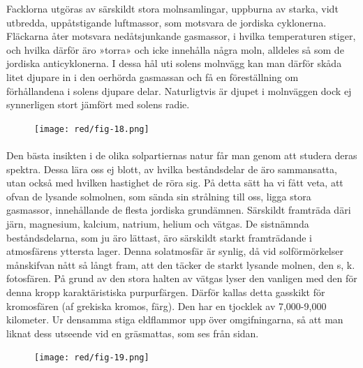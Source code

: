 \documentclass[a4paper, 12pt, oneside, swedish]{article}
\begin{document}
Facklorna utgöras av särskildt stora molnsamlingar, uppburna av starka, vidt utbredda, uppåtstigande luftmassor, som motsvara de jordiska cyklonerna. Fläckarna åter motsvara nedåtsjunkande gasmassor, i hvilka temperaturen stiger, och hvilka därför äro »torra» och icke innehålla några moln, alldeles så som de jordiska anticyklonerna. I dessa hål uti solens molnvägg kan man därför skåda litet djupare in i den oerhörda gasmassan och få en föreställning om förhållandena i solens djupare delar. Naturligtvis är djupet i molnväggen dock ej synnerligen stort jämfört med solens radie.

\begin{figure}[H]
\centering
\texttt{[image: red/fig-18.png]}
\caption{}
\end{figure}
\paragraph{}
Den bästa insikten i de olika solpartiernas natur får man genom att studera deras spektra. Dessa lära oss ej blott, av hvilka beståndsdelar de äro sammansatta, utan också med hvilken hastighet de röra sig. På detta sätt ha vi fått veta, att ofvan de lysande solmolnen, som sända sin strålning till oss, ligga stora gasmassor, innehållande de flesta jordiska grundämnen. Särskildt framträda däri järn, magnesium, kalcium, natrium, helium och vätgas. De sistnämnda beståndsdelarna, som ju äro lättast, äro särskildt starkt framträdande i atmosfärens yttersta lager. Denna solatmosfär är synlig, då vid solförmörkelser månskifvan nått så långt fram, att den täcker de starkt lysande molnen, den s, k. fotosfären. På grund av den stora halten av vätgas lyser den vanligen med den för denna kropp karaktäristiska purpurfärgen. Därför kallas detta gasskikt för kromosfären (af grekiska kromos, färg). Den har en tjocklek av 7,000-9,000 kilometer. Ur densamma stiga eldflammor upp över omgifningarna, så att man liknat dess utseende vid en gräsmattas, som ses från sidan.

\begin{figure}[H]
\centering
\texttt{[image: red/fig-19.png]}
\caption{}
\end{figure}
\end{document}
